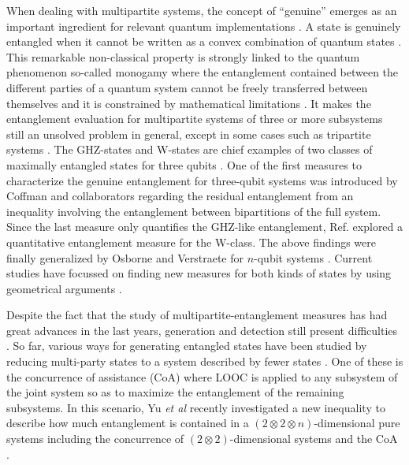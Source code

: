 When dealing with multipartite systems, the concept of ``genuine'' emerges as an important ingredient for relevant quantum implementations \cite{chen2006general, PhysRevA.81.012308, briegel2009measurement}. A state is genuinely entangled when it cannot be written as a convex combination of quantum states \cite{navascues2020genuine}. This remarkable non-classical property is strongly linked to the quantum phenomenon so-called monogamy where the entanglement contained between the different parties of a quantum system cannot be freely transferred between themselves and it is constrained by mathematical limitations \cite{dur2000three, koashi2000entangled, dennison2001entanglement}. It makes the entanglement evaluation for multipartite systems of three or more subsystems still an unsolved problem in general, except in some cases such as tripartite systems \cite{schneeloch2020quantifying, m2019tripartite}. The GHZ-states and W-states are chief examples of two classes of maximally entangled states for three qubits \cite{greenberger1990bell, dur2000three}. One of the first measures to characterize the genuine entanglement for three-qubit systems was introduced by Coffman and collaborators \cite{coffman2000distributed} regarding the residual entanglement from an inequality involving the entanglement between bipartitions of the full system. Since the last measure only quantifies the GHZ-like entanglement, Ref. \cite{ou2007monogamy} explored a quantitative entanglement measure for the W-class. The above findings were finally generalized by Osborne and Verstraete for $n$-qubit systems \cite{osborne2006general}. Current studies have focussed on finding new measures for both kinds of states by using geometrical arguments \cite{xie2021triangle, yang2022entanglement}. 

Despite the fact that the study of multipartite-entanglement measures has had great advances in the last years, generation and detection still present difficulties \cite{gao2010experimental, monz201114, yao2012observation, maity2020detection, sun2021detection}. So far, various ways for generating entangled states have been studied by reducing multi-party states to a system described by fewer states \cite{gour2005deterministic}. One of these is the concurrence of assistance (CoA) \cite{williams1999quantum, 10.5555/2011508.2011514} where LOOC is applied to any subsystem of the joint system so as to maximize the entanglement of the remaining subsystems. In this scenario, Yu \textit{et al} recently investigated a new inequality to describe how much entanglement is contained in a $(2\otimes 2\otimes n)$-dimensional pure systems including the concurrence of $(2\otimes 2)$-dimensional systems and the CoA \cite{yu2008entanglement}. 

